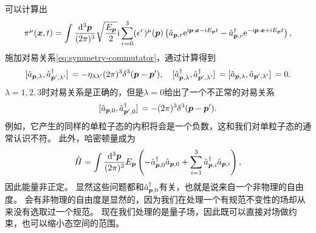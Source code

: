 \documentclass[hyperref, UTF8, a4paper]{ctexart}
\newcommand*{\ii}{\mathrm{i}}
\newcommand*{\ee}{\mathrm{e}}
\begin{document}
可以计算出
\begin{equation}
    \pi^\mu (\vb*{x}, t) = \int \frac{\dd[3]{\vb*{p}}}{(2\pi)^3} \sqrt{\frac{E_{\vb*{p}}}{2}} \ii \sum_{r=0}^3 (\epsilon^r)^\mu (\vb*{p}) \left( \hat{a}_{\vb*{p}, r} \ee^{\ii \vb*{p} \cdot \vb*{x} - \ii E_{\vb*{p}} t} - \hat{a}_{\vb*{p}, r}^\dagger \ee^{ - \ii \vb*{p} \cdot \vb*{x} + \ii E_{\vb*{p}} t} \right),
\end{equation}
施加对易关系\eqref{eq:symmetry-commutator}，通过计算得到
\begin{equation}
    \comm*{\hat{a}_{\vb*{p}, \lambda}}{\hat{a}^\dagger_{\vb*{p}', \lambda'}} = - \eta_{\lambda \lambda'} (2\pi)^3 \delta^3(\vb*{p} - \vb*{p}'), \quad \comm*{\hat{a}^\dagger_{\vb*{p}, \lambda}}{\hat{a}^\dagger_{\vb*{p}', \lambda'}} = \comm*{\hat{a}_{\vb*{p}, \lambda}}{\hat{a}_{\vb*{p}', \lambda'}} = 0.
\end{equation}
$\lambda=1, 2, 3$时对易关系是正确的，但是$\lambda=0$给出了一个不正常的对易关系
\[
    \comm*{\hat{a}_{\vb*{p}, 0}}{\hat{a}^\dagger_{\vb*{p}', 0}} = - (2\pi)^3 \delta^3 (\vb*{p} - \vb*{p}').
\]
例如，它产生的同样的单粒子态的内积将会是一个负数，这和我们对单粒子态的通常认识不符。
此外，哈密顿量成为
\begin{equation}
    \hat{H} = \int \frac{\dd[3]{\vb*{p}}}{(2\pi)^3} E_{\vb*{p}} \left( - \hat{a}_{\vb*{p},0}^\dagger \hat{a}_{\vb*{p}, 0} + \sum_{i=1}^3 \hat{a}_{\vb*{p},i}^\dagger \hat{a}_{\vb*{p}, i} \right),
\end{equation}
因此能量非正定。
显然这些问题都和$\hat{a}^\dagger_{\vb*{p},0}$有关，也就是说来自一个非物理的自由度。
会有非物理的自由度是显然的，因为我们在处理一个有规范不变性的场却从来没有选取过一个规范。
现在我们处理的是量子场，因此既可以直接对场做约束，也可以缩小态空间的范围。
\end{document}
